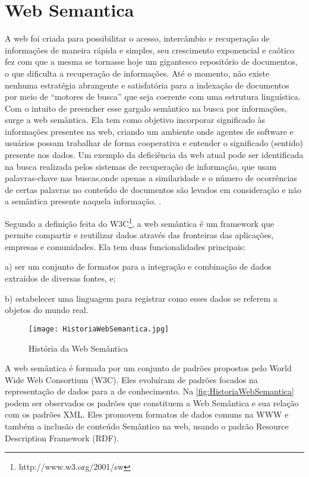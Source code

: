 \label{fundamentacaoteorica}

\section{Web Semantica}
A web foi criada para possibilitar o acesso, intercâmbio e recuperação de informações de maneira rápida e simples, seu crescimento exponencial e caótico fez com que a mesma se tornasse hoje um gigantesco repositório de documentos, o que dificulta a recuperação de informações. Até o momento, não existe nenhuma estratégia abrangente e satisfatória para a indexação de documentos por meio de “motores de busca” que seja coerente com uma estrutura linguística. \cite{SouzaAlvarenga2004a} Com o intuito de preencher esse gargalo semântico na busca por informações, surge a web semântica. Ela tem como objetivo incorporar significado às informações presentes na web, criando um ambiente onde agentes de software e usuários possam trabalhar de forma cooperativa e entender o significado (sentido) presente nos dados. \cite{BrandaoLucena2002} Um exemplo da deficiência da web atual pode ser identificada na busca realizada pelos sistemas de recuperação de informação, que usam palavras-chave nas buscas,onde apenas a similaridade e o número de ocorrências de certas palavras no conteúdo de documentos são levados em consideração e não a semântica presente naquela informação. \cite{SouzaAlvarenga2004a}. 

Segundo a definição feita do W3C\footnote{http://www.w3.org/2001/sw}, a web semântica é um framework que permite compartir e reutilizar dados através das fronteiras das aplicações, empresas e comunidades. Ela tem duas funcionalidades principais: 

a) ser um conjunto de formatos para a integração e combinação de dados extraídos de diversas fontes, e; 

b) estabelecer uma linguagem para registrar como esses dados se referem a objetos do mundo real. 


\begin{figure}[!htb]
    \centering
    \texttt{[image: HistoriaWebSemantica.jpg]}
    \caption{História da Web Semântica}
    \label{fig:HistoriaWebSemantica}
\end{figure}


A web semântica é formada por um conjunto de padrões propostos pelo World Wide Web Consortium (W3C). Eles evoluíram de padrões focados na representação de dados para a de conhecimento. Na \autoref{fig:HistoriaWebSemantica} podem ser observados os padrões que constituem a Web Semântica e sua relação com os padrões XML. Eles promovem formatos de dados comuns na WWW e também a inclusão de conteúdo Semântico na web, usando o padrão Resource Description Framework (RDF).

